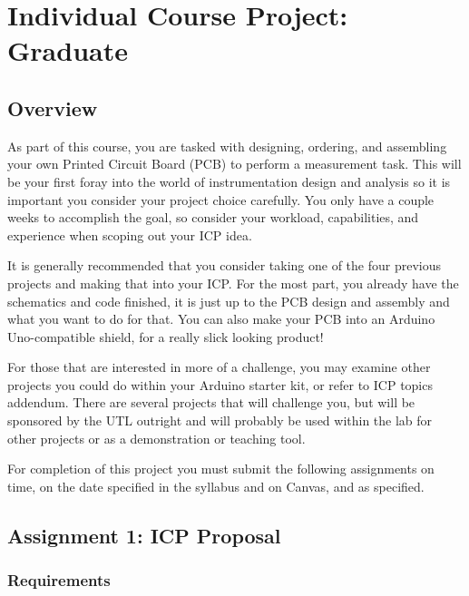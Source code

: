 %


\chapter{Individual Course Project: Graduate}
\setchapterpreamble[u]{\margintoc}

\section*{Overview}
As part of this course, you are tasked with designing, ordering, and assembling your own Printed Circuit Board (PCB) to perform a measurement task.
This will be your first foray into the world of instrumentation design and analysis so it is important you consider your project choice carefully.
You only have a couple weeks to accomplish the goal, so consider your workload, capabilities, and experience when scoping out your ICP idea.

It is generally recommended that you consider taking one of the four previous projects and making that into your ICP.
For the most part, you already have the schematics and code finished, it is just up to the PCB design and assembly and what you want to do for that.
You can also make your PCB into an Arduino Uno-compatible shield, for a really slick looking product!

For those that are interested in more of a challenge, you may examine other projects you could do within your Arduino starter kit, or refer to ICP topics addendum.
There are several projects that will challenge you, but will be sponsored by the UTL outright and will probably be used within the lab for other projects or as a demonstration or teaching tool.

For completion of this project you must submit the following assignments on time, on the date specified in the syllabus and on Canvas, and as specified.

\section*{Assignment 1: ICP Proposal}


    \subsection*{Requirements}
    

